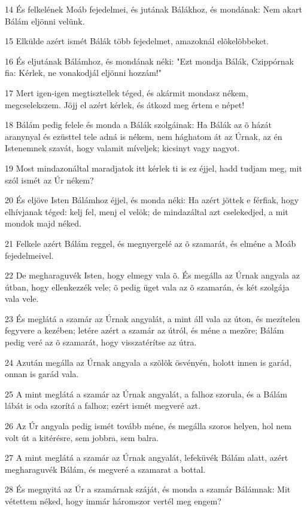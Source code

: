 \par 14 És felkelének Moáb fejedelmei, és jutának Bálákhoz, és mondának: Nem akart Bálám eljönni velünk.
\par 15 Elkülde azért ismét Bálák több fejedelmet, amazoknál elõkelõbbeket.
\par 16 És eljutának Bálámhoz, és mondának néki: "Ezt mondja Bálák, Czippórnak fia: Kérlek, ne vonakodjál eljönni hozzám!"
\par 17 Mert igen-igen megtisztellek téged, és akármit mondasz nékem, megcselekszem. Jöjj el azért kérlek, és átkozd meg értem e népet!
\par 18 Bálám pedig felele és monda a Bálák szolgáinak: Ha Bálák az õ házát aranynyal és ezüsttel tele adná is nékem, nem hághatom át az Úrnak, az én Istenemnek szavát, hogy valamit míveljek; kicsinyt vagy nagyot.
\par 19 Most mindazonáltal maradjatok itt kérlek ti is ez éjjel, hadd tudjam meg, mit szól ismét az Úr nékem?
\par 20 És eljöve Isten Bálámhoz éjjel, és monda néki: Ha azért jöttek e férfiak, hogy elhívjanak téged: kelj fel, menj el velök; de mindazáltal azt cselekedjed, a mit mondok majd néked.
\par 21 Felkele azért Bálám reggel, és megnyergelé az õ szamarát, és elméne a Moáb fejedelmeivel.
\par 22 De megharaguvék Isten, hogy elmegy vala õ. És megálla az Úrnak angyala az útban, hogy ellenkezzék vele; õ pedig üget vala az õ szamarán, és két szolgája vala vele.
\par 23 És meglátá a szamár az Úrnak angyalát, a mint áll vala az úton, és mezítelen fegyvere a kezében; letére azért a szamár az útról, és méne a mezõre; Bálám pedig veré az õ szamarát, hogy visszatérítse az útra.
\par 24 Azután megálla az Úrnak angyala a szõlõk ösvényén, holott innen is garád, onnan is garád vala.
\par 25 A mint meglátá a szamár az Úrnak angyalát, a falhoz szorula, és a Bálám lábát is oda szorítá a falhoz; ezért ismét megveré azt.
\par 26 Az Úr angyala pedig ismét tovább méne, és megálla szoros helyen, hol nem volt út a kitérésre, sem jobbra, sem balra.
\par 27 A mint meglátá a szamár az Úrnak angyalát, lefeküvék Bálám alatt, azért megharaguvék Bálám, és megveré a szamarat a bottal.
\par 28 És megnyitá az Úr a szamárnak száját, és monda a szamár Bálámnak: Mit vétettem néked, hogy immár háromszor vertél meg engem?
